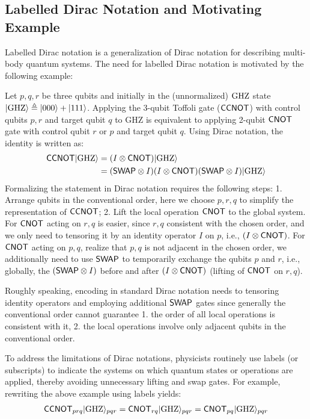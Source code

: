 \subsection{Labelled Dirac Notation and Motivating Example}
Labelled Dirac notation is a generalization of Dirac notation for
describing multi-body quantum systems. The need for labelled Dirac
notation is motivated by the following example:
\begin{example}
  \label{example1}
  Let $p,q,r$ be three qubits and initially in the (unnormalized)
  ${\mathrm{GHZ}}$ state $|{\mathrm{GHZ}}\rangle \triangleq |000\rangle+|111\rangle$.
  Applying the 3-qubit Toffoli gate (${\mathsf{CCNOT}}$) with control qubits
  $p,r$ and target qubit $q$ to GHZ is equivalent to applying 2-qubit
  ${\mathsf{CNOT}}$ gate with control qubit $r$ or $p$ and target qubit $q$.
  Using Dirac notation, the identity is written as:
\begin{align*}
  {\mathsf{CCNOT}}|{\mathrm{GHZ}}\rangle &= (I\otimes {\mathsf{CNOT}})|{\mathrm{GHZ}}\rangle \\
  &= ({\mathsf{SWAP}}\otimes I)(I\otimes {\mathsf{CNOT}})({\mathsf{SWAP}}\otimes I)|{\mathrm{GHZ}}\rangle
\end{align*}
Formalizing the statement in Dirac notation requires the following
steps: 1. Arrange qubits in the conventional order, here we choose
$p,r,q$ to simplify the representation of ${\mathsf{CCNOT}}$; 2. Lift the local
operation ${\mathsf{CNOT}}$ to the global system. For ${\mathsf{CNOT}}$ acting on $r,q$ is
easier, since $r,q$ consistent with the chosen order, and we only need
to tensoring it by an identity operator $I$ on $p$, i.e., $(I\otimes
{\mathsf{CNOT}})$.  For ${\mathsf{CNOT}}$ acting on $p,q$, realize that $p,q$ is not
adjacent in the chosen order, we additionally need to use ${\mathsf{SWAP}}$ to
temporarily exchange the qubits $p$ and $r$, i.e., globally, the
$({\mathsf{SWAP}}\otimes I)$ before and after $(I\otimes {\mathsf{CNOT}})$ (lifting of
${\mathsf{CNOT}}$ on $r,q$).



Roughly speaking, encoding in standard Dirac notation needs to
tensoring identity operators and employing additional ${\mathsf{SWAP}}$ gates
since generally the conventional order cannot guarantee 1. the order
of all local operations is consistent with it, 2. the local operations
involve only adjacent qubits in the conventional order.
\end{example}
To address the limitations of Dirac notations, physicists routinely
use labels (or subscripts) to indicate the systems on which quantum
states or operations are applied, thereby avoiding unnecessary lifting
and swap gates. For example, rewriting the above example using labels
yields:
\begin{align*}
  {\mathsf{CCNOT}}_{prq}|{\mathrm{GHZ}}\rangle_{pqr} = 
  {\mathsf{CNOT}}_{rq}|{\mathrm{GHZ}}\rangle_{pqr}
  = {\mathsf{CNOT}}_{pq}|{\mathrm{GHZ}}\rangle_{pqr}
\end{align*}
